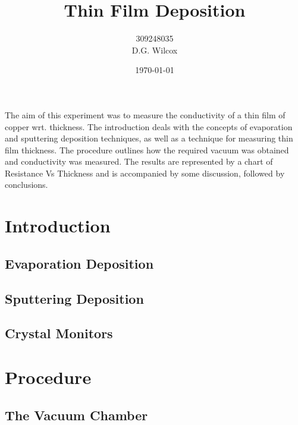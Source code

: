 \documentclass[aps,prl,twocolumn,groupedaddress,showkeys]{revtex4}
\begin{document}
\title{Thin Film Deposition}
\author{309248035 \\
				D.G. Wilcox}

\noaffiliation{}

\date{\today}

\begin{abstract}
\end{abstract}



\maketitle

The aim of this experiment was to measure the conductivity of a thin film of copper wrt. thickness. The introduction deals with the concepts of evaporation and sputtering deposition techniques, as well as a technique for measuring thin film thickness. The procedure outlines how the required vacuum was obtained and conductivity was measured. The results are represented by a chart of Resistance Vs Thickness and is accompanied by some discussion, followed by conclusions.

\section{Introduction}

\subsection{Evaporation Deposition}

\subsection{Sputtering Deposition}

\subsection{Crystal Monitors}


\section{Procedure}

\subsection{The Vacuum Chamber}
\end{document}
